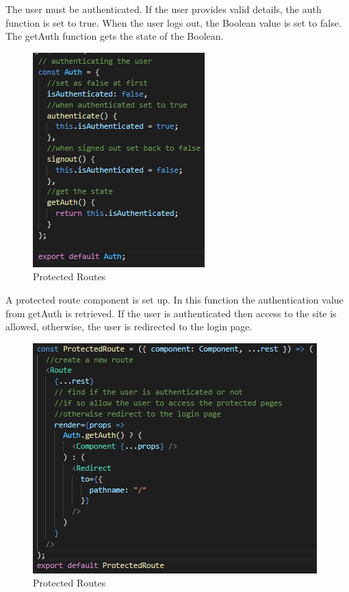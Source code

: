 The user must be authenticated. If the user provides valid details, the auth function is set to true. When the user logs out, the Boolean value is set to false. The getAuth function gets the state of the Boolean.
\\
\begin{figure}[H]
    \centering
    \includegraphics{img/Auth.png}
    \caption{Protected Routes}
    \label{fig:my_label}
\end{figure}

A protected route component is set up. In this function the authentication value from getAuth is retrieved. If the user is authenticated then access to the site is allowed, otherwise, the user is redirected to the login page.\\
\begin{figure}[H]
    \centering
    \includegraphics{img/Protected.png}
    \caption{Protected Routes}
    \label{fig:my_label}
\end{figure}

